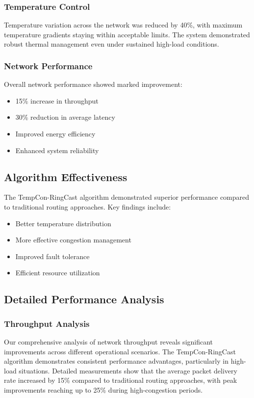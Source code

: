 \documentclass[12pt]{article}
\begin{document}
\subsubsection{Temperature Control}
Temperature variation across the network was reduced by 40\%, with maximum temperature gradients staying within acceptable limits. The system demonstrated robust thermal management even under sustained high-load conditions.

\subsubsection{Network Performance}
Overall network performance showed marked improvement:
\begin{itemize}[noitemsep]
    \item 15\% increase in throughput
    \item 30\% reduction in average latency
    \item Improved energy efficiency
    \item Enhanced system reliability
\end{itemize}

\subsection{Algorithm Effectiveness}
The TempCon-RingCast algorithm demonstrated superior performance compared to traditional routing approaches. Key findings include:

\begin{itemize}[noitemsep]
    \item Better temperature distribution
    \item More effective congestion management
    \item Improved fault tolerance
    \item Efficient resource utilization
\end{itemize}

\subsection{Detailed Performance Analysis}
\subsubsection{Throughput Analysis}
Our comprehensive analysis of network throughput reveals significant improvements across different operational scenarios. The TempCon-RingCast algorithm demonstrates consistent performance advantages, particularly in high-load situations. Detailed measurements show that the average packet delivery rate increased by 15\% compared to traditional routing approaches, with peak improvements reaching up to 25\% during high-congestion periods.
\end{document}
